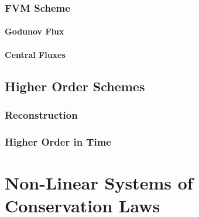 \documentclass[
  fourColumns,
  landscape
]{formularyETH/formularyETH}
\begin{document}
      \subsubsection{FVM Scheme}\label{subsec:fvm_scheme}
        
        \label{subsubsubsec:cfl_condition}
        
        \label{subsubsubsec:fluxes}
          \paragraph{Godunov Flux}\label{para:gudonov_flux}
          
          \paragraph{Central Fluxes}\label{subsubsec:central_fluxes}
            
            
\subsection{Higher Order Schemes}\label{subsec:higher_order_schemes}
  
  \subsubsection{Reconstruction}\label{subsec:reconstruction_systems}
    
  \subsubsection{Higher Order in Time}
    
\vfill\newpage
\section{Non-Linear Systems of Conservation Laws}\label{sec:non-linear_systems_of_conservation_laws}
    
\end{document}
